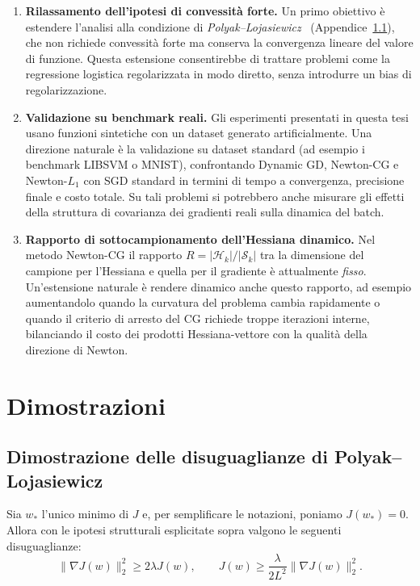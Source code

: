 \documentclass[a4paper,12pt]{article}
\numberwithin{equation}{section}
\numberwithin{figure}{section}
\numberwithin{table}{section}
\begin{document}
\begin{enumerate}
  \item \textbf{Rilassamento dell'ipotesi di convessità forte.} Un primo
  obiettivo è estendere l'analisi alla condizione di \emph{Polyak--Lojasiewicz}~\cite{polyak1964, karimi2016}
  (Appendice~\ref{app:pl}), che non richiede convessità forte ma conserva la
  convergenza lineare del valore di funzione. Questa estensione consentirebbe
  di trattare problemi come la regressione logistica regolarizzata in modo
  diretto, senza introdurre un bias di regolarizzazione.
  \item \textbf{Validazione su benchmark reali.} Gli esperimenti presentati in
  questa tesi usano funzioni sintetiche con un dataset generato artificialmente.
  Una direzione naturale è la validazione su dataset standard (ad esempio i
  benchmark LIBSVM o MNIST), confrontando Dynamic GD, Newton-CG e Newton-$L_1$
  con SGD standard in termini di tempo a convergenza, precisione finale e
  costo totale. Su tali problemi si potrebbero anche misurare gli effetti della
  struttura di covarianza dei gradienti reali sulla dinamica del batch.
  \item \textbf{Rapporto di sottocampionamento dell'Hessiana dinamico.} Nel
  metodo Newton-CG il rapporto $R = |\mathcal{H}_k|/|\mathcal{S}_k|$ tra la
  dimensione del campione per l'Hessiana e quella per il gradiente è
  attualmente \emph{fisso}. Un'estensione naturale è rendere dinamico anche
  questo rapporto, ad esempio aumentandolo quando la curvatura del problema
  cambia rapidamente o quando il criterio di arresto del CG richiede troppe
  iterazioni interne, bilanciando il costo dei prodotti Hessiana-vettore con la
  qualità della direzione di Newton.
\end{enumerate}

\appendix
\section{Dimostrazioni}\label{app:dimostrazioni}

\subsection{Dimostrazione delle disuguaglianze di \newline Polyak--Lojasiewicz}\label{app:pl}

Sia $w_*$ l'unico minimo di $J$ e, per semplificare le notazioni, poniamo $J(w_*) = 0$. Allora con le ipotesi strutturali esplicitate sopra valgono le seguenti disuguaglianze:
\[
\|\nabla J(w)\|_2^2 \geq 2\lambda J(w), \qquad J(w) \geq \frac{\lambda}{2L^2} \|\nabla J(w)\|_2^2.
\]
\end{document}
